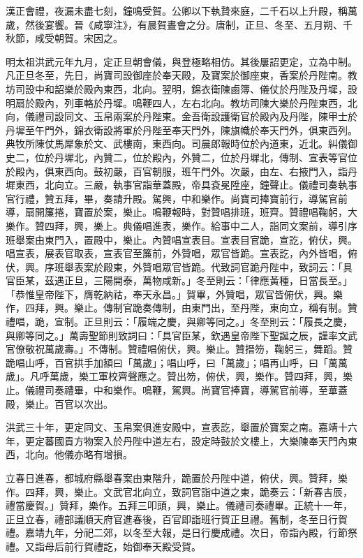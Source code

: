 漢正會禮，夜漏未盡七刻，鐘鳴受賀。公卿以下執贄來庭，二千石以上升殿，稱萬歲，然後宴饗。晉《咸寧注》，有晨賀晝會之分。唐制，正旦、冬至、五月朔、千秋節，咸受朝賀。宋因之。

明太祖洪武元年九月，定正旦朝會儀，與登極略相仿。其後屢詔更定，立為中制。凡正旦冬至，先日，尚寶司設御座於奉天殿，及寶案於御座東，香案於丹陛南。教坊司設中和韶樂於殿內東西，北向。翌明，錦衣衛陳鹵簿、儀仗於丹陛及丹墀，設明扇於殿內，列車輅於丹墀。鳴鞭四人，左右北向。教坊司陳大樂於丹陛東西，北向，儀禮司設同文、玉帛兩案於丹陛東。金吾衛設護衛官於殿內及丹陛，陳甲士於丹墀至午門外，錦衣衛設將軍於丹陛至奉天門外，陳旗幟於奉天門外，俱東西列。典牧所陳仗馬犀象於文、武樓南，東西向。司晨郎報時位於內道東，近北。糾儀御史二，位於丹墀北，內贊二，位於殿內，外贊二，位於丹墀北，傳制、宣表等官位於殿內，俱東西向。鼓初嚴，百官朝服，班午門外。次嚴，由左、右掖門入，詣丹墀東西，北向立。三嚴，執事官詣華蓋殿，帝具袞冕陞座，鐘聲止。儀禮司奏執事官行禮，贊五拜，畢，奏請升殿。駕興，中和樂作。尚寶司捧寶前行，導駕官前導，扇開簾捲，寶置於案，樂止。鳴鞭報時，對贊唱排班，班齊。贊禮唱鞠躬，大樂作。贊四拜，興，樂上。典儀唱進表，樂作。給事中二人，詣同文案前，導引序班舉案由東門入，置殿中，樂止。內贊唱宣表目。宣表目官跪，宣訖，俯伏，興。唱宣表，展表官取表，宣表官至簾前，外贊唱，眾官皆跪。宣表訖，內外皆唱，俯伏，興。序班舉表案於殿東，外贊唱眾官皆跪。代致詞官跪丹陛中，致詞云：「具官臣某，茲遇正旦，三陽開泰，萬物咸新。」冬至則云：「律應黃種，日當長至。」「恭惟皇帝陛下，膺乾納祜，奉天永昌。」賀畢，外贊唱，眾官皆俯伏，興。樂作，四拜，興。樂止。傳制官跪奏傳制，由東門出，至丹陛，東向立，稱有制。贊禮唱，跪，宣制。正旦則云：「履端之慶，與卿等同之。」冬至則云：「履長之慶，與卿等同之。」萬壽聖節則致詞曰：「具官臣某，欽遇皇帝陛下聖誕之辰，謹率文武官僚敬祝萬歲壽。」不傳制。贊禮唱俯伏，興。樂止。贊搢笏，鞠躬三，舞蹈。贊跪唱山呼，百官拱手加額曰「萬歲」；唱山呼，曰「萬歲」；唱再山呼，曰「萬萬歲」。凡呼萬歲，樂工軍校齊聲應之。贊出笏，俯伏，興，樂作。贊四拜，興，樂止。儀禮司奏禮畢，中和樂作。鳴鞭，駕興。尚寶官捧寶，導駕官前導，至華蓋殿，樂止。百官以次出。

洪武三十年，更定同文、玉帛案俱進安殿中，宣表訖，舉置於寶案之南。嘉靖十六年，更定蕃國貢方物案入於丹陛中道左右，設定時鼓於文樓上，大樂陳奉天門內東西，北向。他儀亦略有增損。

立春日進春，都城府縣舉春案由東階升，跪置於丹陛中道，俯伏，興。贊拜，樂作。四拜，興，樂止。文武官北向立，致詞官詣中道之東，跪奏云：「新春吉辰，禮當慶賀。」贊拜，樂作。五拜三叩頭，興，樂止。儀禮司奏禮畢。正統十一年，正旦立春，禮部議順天府官進春後，百官即詣班行賀正旦禮。舊制，冬至日行賀禮。嘉靖九年，分祀二郊，以冬至大報，是日行慶成禮。次日，帝詣內殿，行節祭禮。又詣母后前行賀禮訖，始御奉天殿受賀。

